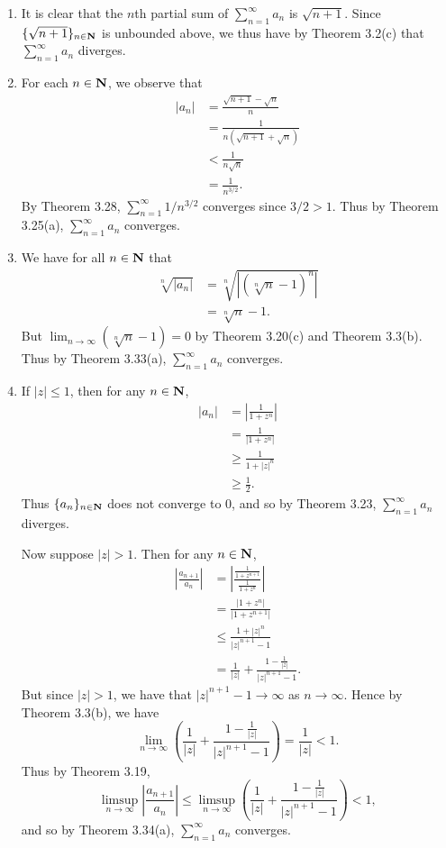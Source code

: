 \begin{ex}
\begin{enumerate}
\item It is clear that the $n$th partial sum of $\sum_{n = 1}^{\infty}a_n$ is $\sqrt{n+1}$. Since $\{\sqrt{n+1}\}_{n \in \mathbf{N}}$ is unbounded above, we thus have by Theorem 3.2(c) that $\sum_{n = 1}^{\infty}a_n$ diverges.

\item For each $n \in \mathbf{N}$, we observe that
\begin{align*}
|a_n| & = \frac{\sqrt{n+1} - \sqrt{n}}{n}\\
& = \frac{1}{n(\sqrt{n + 1} + \sqrt{n})}\\
& < \frac{1}{n\sqrt{n}}\\
& = \frac{1}{n^{3/2}}.
\end{align*}
By Theorem 3.28, $\sum_{n = 1}^{\infty}1/n^{3/2}$ converges since $3/2 > 1$. Thus by Theorem 3.25(a), $\sum_{n = 1}^{\infty}a_n$ converges.

\item We have for all $n \in \mathbf{N}$ that
\begin{align*}
\sqrt[n]{|a_n|} & = \sqrt[n]{\left|(\sqrt[n]{n} - 1)^n\right|}\\
& = \sqrt[n]{n} - 1.
\end{align*}
But $\lim_{n\to\infty}(\sqrt[n]{n} - 1) = 0$ by Theorem 3.20(c) and Theorem 3.3(b). Thus by Theorem 3.33(a), $\sum_{n = 1}^{\infty}a_n$ converges.

\item If $|z| \leq 1$, then for any $n \in \mathbf{N}$,
\begin{align*}
|a_n| & = \left|\frac{1}{1 + z^n}\right|\\
& = \frac{1}{|1 + z^n|}\\
& \geq \frac{1}{1 + |z|^n}\\
& \geq \frac{1}{2}.
\end{align*}
Thus $\{a_n\}_{n \in \mathbf{N}}$ does not converge to 0, and so by Theorem 3.23, $\sum_{n = 1}^{\infty} a_n$ diverges.

Now suppose $|z| > 1$. Then for any $n \in \mathbf{N}$,
\begin{align*}
\left|\frac{a_{n+1}}{a_n}\right| & = \left|\frac{\frac{1}{1 + z^{n+1}}}{\frac{1}{1 + z^n}}\right|\\
& = \frac{|1 + z^n|}{|1 + z^{n+1}|}\\
& \leq \frac{1 + |z|^n}{|z|^{n+1} - 1}\\
& = \frac{1}{|z|} + \frac{1 - \frac{1}{|z|}}{|z|^{n+1} - 1}.
\end{align*}
But since $|z| > 1$, we have that $|z|^{n+1} - 1 \to \infty$ as $n \to \infty$. Hence by Theorem 3.3(b), we have \[\lim_{n\to\infty}\left(\frac{1}{|z|} + \frac{1 - \frac{1}{|z|}}{|z|^{n+1} - 1}\right) = \frac{1}{|z|} < 1.\] Thus by Theorem 3.19, \[\limsup_{n\to\infty}\left|\frac{a_{n+1}}{a_n}\right| \leq \limsup_{n\to\infty}\left(\frac{1}{|z|} + \frac{1 - \frac{1}{|z|}}{|z|^{n+1} - 1}\right) < 1,\] and so by Theorem 3.34(a), $\sum_{n = 1}^{\infty}a_n$ converges.
\end{enumerate}
\end{ex}

